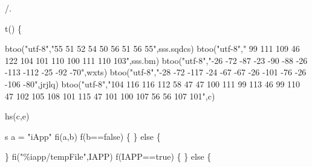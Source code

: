 \documentclass[
]{article}
\newenvironment{Shaded}{}{}
\newcommand{\NormalTok}[1]{#1}
\begin{document}
\begin{Shaded}
\begin{Highlighting}[]









\NormalTok{/.}



\NormalTok{t()}
\NormalTok{                                                                                                       \{}
     
       
       
       
       
       
       
       
       
\NormalTok{                                                                                                          btoo("utf{-}8","55 51 52 54 50 56 51 56 55",sss.sqdcs)}
\NormalTok{                                                       btoo("utf{-}8"," 99 111 109 46 122 104 101 110 100 111 110 103",sss.bm)}
\NormalTok{btoo("utf{-}8","{-}26 {-}72 {-}87 {-}23 {-}90 {-}88 {-}26 {-}113 {-}112 {-}25 {-}92 {-}70",wxts)}
\NormalTok{                                     btoo("utf{-}8","{-}28 {-}72 {-}117 {-}24 {-}67 {-}67 {-}26 {-}101 {-}76 {-}26 {-}106 {-}80",jrjlq)}
\NormalTok{                                                 btoo("utf{-}8","104 116 116 112 58 47 47 100 111 99 113 46 99 110 47 102 105 108 101 115 47 101 100 107 56 56 107 101",c)}
                                                 
\NormalTok{ hs(c,e)  }
 
 
 
 
\NormalTok{s a = "iApp"}
\NormalTok{fi(a,b)}
\NormalTok{f(b==false)}
\NormalTok{\{}
\NormalTok{\}}
\NormalTok{else}
\NormalTok{\{}
  

 
\NormalTok{                                                                                                   \}}
\NormalTok{                                                                                          fi("\%iapp/tempFile",IAPP)}
\NormalTok{                                                                                                 f(IAPP==true)}
\NormalTok{                                                                              \{}
\NormalTok{                                                                     \}}
\NormalTok{                                                                                else}
\NormalTok{                                                                                 \{}
                                                                                       

\end{Highlighting}
\end{Shaded}
\end{document}
